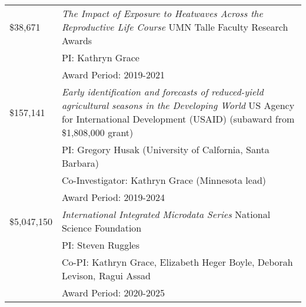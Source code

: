 \documentclass[11pt]{article} %
\begin{document}
\begin{tabular}{lp{11cm}}
\$38,671 &\emph{The Impact of Exposure to Heatwaves Across the Reproductive Life Course} UMN Talle Faculty Research Awards\\
&PI: Kathryn Grace\\
&Award Period: 2019-2021\\



\$157,141 &\emph{Early identification and forecasts of reduced-yield agricultural seasons in the Developing World} US Agency for International Development (USAID) (subaward from \$1,808,000 grant)\\
&PI: Gregory Husak (University of Calfornia, Santa Barbara)\\
&Co-Investigator: Kathryn Grace (Minnesota lead)\\
&Award Period: 2019-2024\\



\$5,047,150 & \emph{International Integrated Microdata Series} National Science Foundation\\
&PI: Steven Ruggles\\
&Co-PI: Kathryn Grace, Elizabeth Heger Boyle, Deborah Levison, Ragui Assad\\
&Award Period: 2020-2025\\

\end{tabular}
\end{document}
